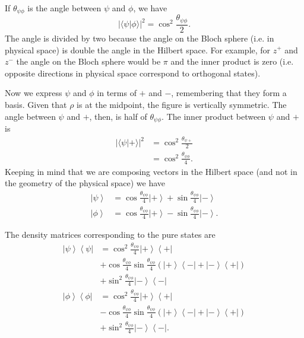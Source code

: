 \documentclass[10pt,twocolumn, nofootinbib]{revtex4-1}
\begin{document}
If $\theta_{\psi\phi}$ is the angle between $\psi$ and $\phi$, we have
\begin{equation}
	|\langle \psi | \phi \rangle |^2 = \cos^2 \frac{\theta_{\psi\phi}}{2}.
\end{equation}
The angle is divided by two because the angle on the Bloch sphere (i.e. in physical space) is double the angle in the Hilbert space. For example, for $z^+$ and $z^-$ the angle on the Bloch sphere would be $\pi$ and the inner product is zero (i.e. opposite directions in physical space correspond to orthogonal states).

Now we express $\psi$ and $\phi$ in terms of $+$ and $-$, remembering that they form a basis. Given that $\rho$ is at the midpoint, the figure is vertically symmetric. The angle between $\psi$ and $+$, then, is half of $\theta_{\psi\phi}$. The inner product between $\psi$ and $+$ is
\begin{equation}
	\begin{aligned}
	|\langle \psi | + \rangle |^2 &= \cos^2 \frac{\theta_{\psi +}}{2} \\
&= \cos^2 \frac{\theta_{\psi\phi}}{4}.
	\end{aligned}
\end{equation}
Keeping in mind that we are composing vectors in the Hilbert space (and not in the geometry of the physical space) we have
\begin{align*}
	\left|\psi\right>&=\cos\frac{\theta_{\psi\phi}}{4}\left|+\right>+\sin\frac{\theta_{\psi\phi}}{4}\left|-\right> \\
	\left|\phi\right>&=\cos\frac{\theta_{\psi\phi}}{4}\left|+\right>-\sin\frac{\theta_{\psi\phi}}{4}\left|-\right>.
\end{align*}

The density matrices corresponding to the pure states are
\begin{align*}
	\left|\psi\right>\left<\psi\right|&=\cos^2\frac{\theta_{\psi\phi}}{4}\left|+\right>\left<+\right|\\
	&+\cos\frac{\theta_{\psi\phi}}{4}\sin\frac{\theta_{\psi\phi}}{4}\left(\left|+\right>\left<-\right|+\left|-\right>\left<+\right|\right) \\
	&+\sin^2\frac{\theta_{\psi\phi}}{4}\left|-\right>\left<-\right| \\
	\left|\phi\right>\left<\phi\right|&=\cos^2\frac{\theta_{\psi\phi}}{4}\left|+\right>\left<+\right|\\
	&-\cos\frac{\theta_{\psi\phi}}{4}\sin\frac{\theta_{\psi\phi}}{4}\left(\left|+\right>\left<-\right|+\left|-\right>\left<+\right|\right) \\
	&+\sin^2\frac{\theta_{\psi\phi}}{4}\left|-\right>\left<-\right|.
\end{align*}
\end{document}
